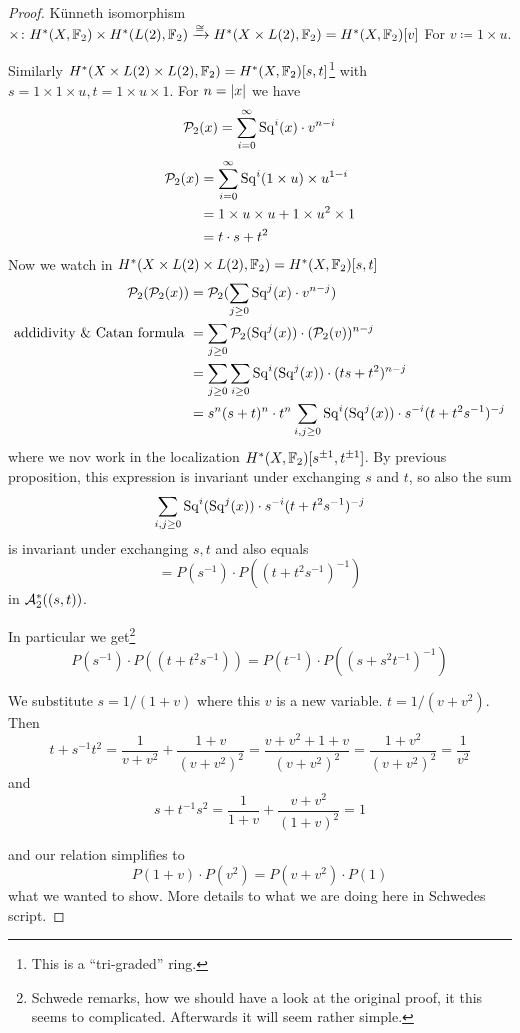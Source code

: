 \documentclass[language=english]{TemplateLecture}
\begin{document}
\begin{proof}
    Künneth isomorphism \(\times \colon H^*(X, \mathbb{F}_2)\times H^*(L(2), \mathbb{F}_2) \xrightarrow{\cong} H^*(X\times L(2), \mathbb{F}_2) = H^*(X, \mathbb{F}_2)[v]\) For \(v \coloneq 1 \times u\).

    Similarly \(H^*(X\times L(2)\times L(2), \mathbb{F}_2) = H^*(X, \mathbb{F}_2)[s, t]\)\footnote{This is a \enquote{tri-graded} ring.} with \(s = 1 \times 1 \times u, t = 1 \times u \times 1\). For \(n = \lvert x\rvert\) we have
    \[\mathcal{P}_2(x) = \sum_{i = 0}^\infty \mathrm{Sq}^i(x) \cdot v^{n-i} \]
    \[\begin{split}
        \mathcal{P}_2(x) &= \sum_{ i = 0}^\infty \mathrm{Sq}^i(1\times u) \times u^{1-i} \\
        &= 1\times u \times u + 1\times u^2 \times 1 \\
        &= t \cdot s + t^2
    \end{split}\]
    Now we watch in \(H^*(X\times L(2)\times L(2), \mathbb{F}_2) = H^*(X, \mathbb{F}_2)[s,t]\)
    \[\begin{split}
        \mathcal{P}_2(\mathcal{P}_2(x)) &= \mathcal{P}_2(\sum_{j\geq 0}\mathrm{Sq}^j(x)\cdot v^{n-j}) \\
        \text{addidivity \& Catan formula } &= \sum_{j \geq0} \mathcal{P}_2(\mathrm{Sq}^j(x)) \cdot (\mathcal{P}_2(v))^{n-j} \\
        &= \sum_{j\geq 0}\sum_{i \geq 0} \mathrm{Sq}^i(\mathrm{Sq}^j(x)) \cdot (ts+ t^2)^{n-j} \\
        &= s^n(s+t)^n\cdot t^n \sum_{i,j\geq 0} \mathrm{Sq}^i(\mathrm{Sq}^j(x)) \cdot s^{-i}(t+t^2s^{-1})^{-j} \\
    \end{split}\]
    where we nov work in the localization \(H^*(X,\mathbb{F}_2)[s^{\pm 1}, t^{\pm1}]\). By previous proposition, this expression is invariant under exchanging \(s\) and \(t\), so also the sum
    \[\sum_{i, j \geq 0} \mathrm{Sq}^i(\mathrm{Sq}^j(x)) \cdot s^{-i}(t+ t^2s^{-1})^{-j}\]
    is invariant under exchanging \(s,t\) and also equals
    \[= P(s^{-1}) \cdot P((t+t^2s^{-1})^{-1})\]
    in \(\mathcal{A}_2^*((s,t))\).

    In particular we get\footnote{Schwede remarks, how we should have a look at the original proof, it this seems to complicated. Afterwards it will seem rather simple.}
    \[P(s^{-1})\cdot P((t+t^2s^{-1})) = P(t^{-1}) \cdot P((s+s^2t^{-1})^{-1})\]

    We substitute \(s = 1/(1+v)\) where this \(v\) is a new variable. \(t = 1/(v+v^2)\). Then
    \[t+s^{-1}t^2 = \frac{1}{v+v^2} + \frac{1+v}{(v+v^2)^2} = \frac{v+v^2+1+v}{(v+v^2)^2} = \frac{1+ v^2}{(v+v^2)^2} = \frac{1}{v^2}\]
    and
    \[s+t^{-1}s^2 = \frac{1}{1+v} + \frac{v+v^2}{(1+v)^2} = 1\]

    and our relation simplifies to
    \[P(1+v) \cdot P(v^2) = P(v+v^2)\cdot P(1)\]
    what we wanted to show. More details to what we are doing here in Schwedes script.
\end{proof}
\end{document}
